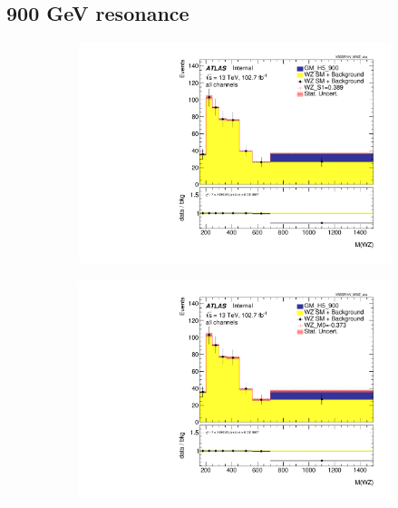 \documentclass[../Bachelorarbeit.tex]{subfiles}
\begin{document}
\subsection{900 GeV resonance}
\begin{figure}[h]

    \centering
    \begin{subfigure}{0.35\textwidth}
        \includegraphics[width=\textwidth]{Plots/ALL_MWZ_right_color/GM_H5_900/S1/2022-05-07/VBSSR/all_VV_MWZ_vbs.pdf}
    \end{subfigure}
    \begin{subfigure}{0.35\textwidth}
        \includegraphics[width=\textwidth]{Plots/ALL_MWZ_right_color/GM_H5_900/M0/2022-05-07/VBSSR/all_VV_MWZ_vbs.pdf}
    \end{subfigure}
    \begin{subfigure}{0.35\textwidth}

\end{subfigure}
\end{figure}
\end{document}

